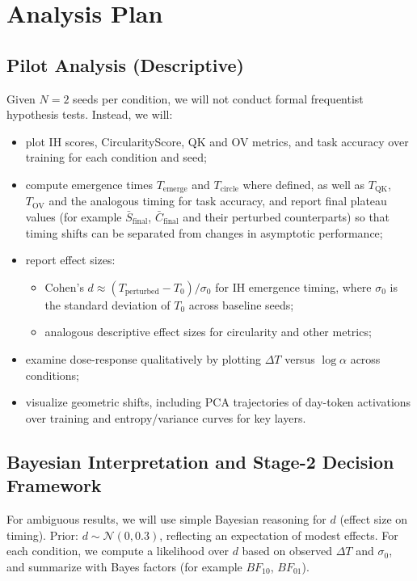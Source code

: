 \documentclass[11pt]{article}
\begin{document}
\section{Analysis Plan}

\subsection{Pilot Analysis (Descriptive)}

Given $N = 2$ seeds per condition, we will not conduct formal frequentist hypothesis tests. Instead, we will:
\begin{itemize}
  \item plot IH scores, CircularityScore, QK and OV metrics, and task accuracy over training for each condition and seed;
  \item compute emergence times $T_{\text{emerge}}$ and $T_{\text{circle}}$ where defined, as well as $T_{\text{QK}}$, $T_{\text{OV}}$ and the analogous timing for task accuracy, and report final plateau values (for example $\bar{S}_{\text{final}}$, $\bar{C}_{\text{final}}$ and their perturbed counterparts) so that timing shifts can be separated from changes in asymptotic performance;
  \item report effect sizes:
    \begin{itemize}
      \item Cohen's $d \approx (T_{\text{perturbed}} - T_0) / \sigma_0$ for IH emergence timing, where $\sigma_0$ is the standard deviation of $T_0$ across baseline seeds;
      \item analogous descriptive effect sizes for circularity and other metrics;
    \end{itemize}
  \item examine dose-response qualitatively by plotting $\Delta T$ versus $\log \alpha$ across conditions;
  \item visualize geometric shifts, including PCA trajectories of day-token activations over training and entropy/variance curves for key layers.
\end{itemize}

\subsection{Bayesian Interpretation and Stage-2 Decision Framework}

For ambiguous results, we will use simple Bayesian reasoning for $d$ (effect size on timing). Prior: $d \sim \mathcal{N}(0, 0.3)$, reflecting an expectation of modest effects. For each condition, we compute a likelihood over $d$ based on observed $\Delta T$ and $\sigma_0$, and summarize with Bayes factors (for example $BF_{10}$, $BF_{01}$).
\end{document}
